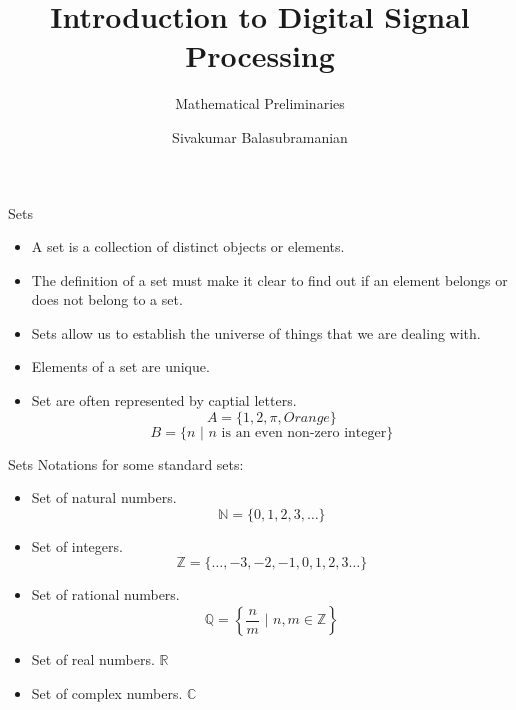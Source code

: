 \documentclass[aspectratio=169]{beamer}
\title{Introduction to Digital Signal Processing}
\subtitle{Mathematical Preliminaries}
\author{Sivakumar Balasubramanian}
\institute[Christian Medical College] %
{
  \inst{}%
  Department of Bioengineering\\
  Christian Medical College, Bagayam\\
  Vellore 632002
}
\date{}
\begin{document}
\begin{frame}
  \titlepage
\end{frame}

\begin{frame}[t]{Sets}
    \begin{itemize}
        \item A set is a collection of distinct objects or elements.
        
        \item The definition of a set must make it clear to find out if an element belongs or does not belong to a set.

        \item Sets allow us to establish the universe of things that we are dealing with.

        \item Elements of a set are unique.

        \item Set are often represented by captial letters.
        $$ A = \{1, 2, \pi, Orange\} $$
        $$ B = \{ n \,\, \vert \,\, n \text{ is an even non-zero integer} \} $$
    \end{itemize}
\end{frame}

\begin{frame}[t]{Sets}
    Notations for some standard sets:
    \begin{itemize}
        \item  Set of natural numbers. 
        $$\mathbb{N} = \{ 0, 1, 2, 3, \ldots \}$$
        \item Set of integers. 
        $$\mathbb{Z} = \{\ldots, -3, -2, -1, 0, 1, 2, 3 \ldots \}$$
        \item Set of rational numbers. 
        $$\mathbb{Q} = \left\{ \frac{n}{m} \,\, \Bigg\vert \,\, n, m \in \mathbb{Z} \right\}$$
        \item Set of real numbers. $\mathbb{R}$
        \item Set of complex numbers. $\mathbb{C}$
    \end{itemize}
\end{frame}
\end{document}
